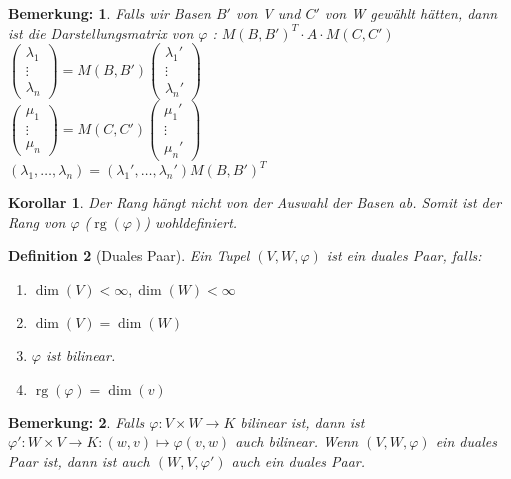 \documentclass{report}
\newcommand{\lb}{\lambda}
\newcommand{\ve}[1]{{\begin{pmatrix}#1 \end{pmatrix}}}
\DeclareMathOperator{\rg}{rg}
\theoremstyle{customrem}
\newtheorem*{bemerkung}{Bemerkung\textnormal:}
\theoremstyle{customdef}
\newtheorem{definition}{Definition}[chapter]
\newtheorem{korrolar}[definition]{Korollar}
\theoremstyle{customenv}
\begin{document}
\begin{bemerkung}
  Falls wir Basen \(B'\) von V und \(C'\) von W gew\"ahlt h\"atten, dann ist 
  die Darstellungsmatrix von \(\varphi\) : \(M(B, B')^T \cdot A \cdot M(C, C')\)
  \(\ve{\lb_1 \\ \vdots \\ \lb_n} = M(B, B') \ve{\lb_1' \\ \vdots \\ \lb_n'}\)\\
  \(\ve{\mu_1 \\ \vdots \\ \mu_n} = M(C, C') \ve{\mu_1' \\ \vdots \\ \mu_n'}\)\\
  \((\lb_1, \dots, \lb_n) = (\lb_1', \dots, \lb_n') M(B, B')^T\)
\end{bemerkung}

\begin{korrolar}
  Der Rang h\"angt nicht von der Auswahl der Basen ab. Somit ist der Rang von
  \(\varphi\) (\(\rg(\varphi)\)) wohldefiniert.
\end{korrolar}

\begin{definition}[Duales Paar]
  Ein Tupel \((V, W, \varphi)\) ist ein duales Paar, falls:
  \begin{enumerate}
    \item{\(\dim(V) < \infty, \dim(W) < \infty\)}
    \item{\(\dim(V) = \dim(W)\)}
    \item{\(\varphi\) ist bilinear.}
    \item{\(\rg(\varphi) = \dim(v)\)}
  \end{enumerate}
\end{definition}

\begin{bemerkung}
  Falls \(\varphi : V \times W \to K\) bilinear ist, dann ist \(\varphi' : W \times V
  \to K : (w, v) \mapsto \varphi(v, w)\) auch bilinear. Wenn \((V, W, \varphi)\)
  ein duales Paar ist, dann ist auch \((W, V, \varphi')\) auch ein duales Paar.
\end{bemerkung}
\end{document}
